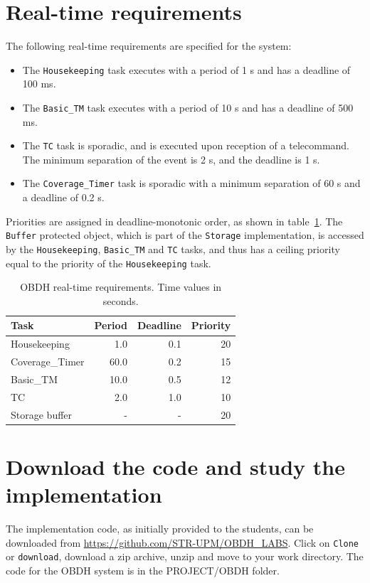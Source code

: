 \section{Real-time requirements}

The following real-time requirements are specified for the system:
\begin{itemize}
\item The {\tt Housekeeping} task executes with a period of 1 s and has a deadline of 100 ms.
\item The {\tt Basic\_TM} task executes with a period of 10 s and has a deadline of 500 ms.
\item The {\tt TC} task is sporadic, and is executed upon reception of a telecommand. The minimum separation of the event is 2 s, and the deadline is 1 s.
\item The {\tt Coverage\_Timer} task is sporadic with a minimum separation of 60 s and a deadline of 0.2 s.
\end{itemize}
Priorities are assigned in deadline-monotonic order, as shown in table~\ref{tb:obdh-requirements}. The {\tt Buffer} protected object, which is part of the {\tt Storage} implementation, is accessed by the {\tt Housekeeping}, {\tt Basic\_TM} and {\tt TC} tasks, and thus has a ceiling priority equal to the priority of the {\tt Housekeeping} task.

\begin{table}[htb]
\begin{center}
\begin{tabular}{|l|r|r|r|} \hline
Task & Period & Deadline & Priority\\ \hline
Housekeeping & 1.0 & 0.1 & 20 \\
Coverage\_Timer & 60.0 & 0.2 & 15 \\
Basic\_TM & 10.0 & 0.5 & 12 \\
TC & 2.0 & 1.0 & 10 \\
Storage buffer & - & - & 20 \\ \hline
\end{tabular}
\caption{OBDH real-time requirements. Time values in seconds.}
\label{tb:obdh-requirements}
\end{center}
\end{table}

\section{Download the code and study the implementation}


The implementation code, as initially provided to the students, can be downloaded from \url{https://github.com/STR-UPM/OBDH\_LABS}. Click on {\tt Clone} or {\tt download}, download a zip archive, unzip and move to your work directory. The code for the OBDH system is in the PROJECT/OBDH folder.

